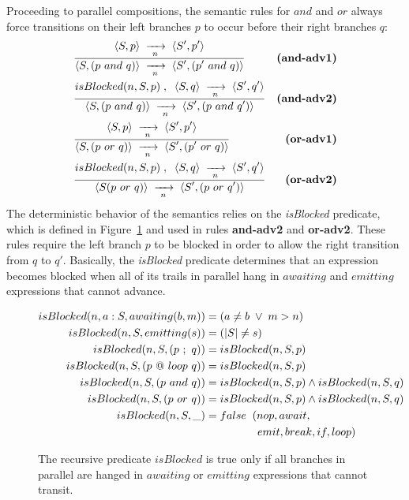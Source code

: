 Proceeding to parallel compositions, the semantic rules for $and$ and $or$ 
always force transitions on their left branches $p$ to occur before their right 
branches $q$:
%
{ \setlength{\jot}{20pt}
\begin{eqnarray*}
& \frac
    {\DS \LL S,p \RR \ST \LL S',p' \RR }
    {\DS \LL S, (p~and~q) \RR \ST \LL S', (p'~and~q) \RR }
    & \textbf{(and-adv1)}      \\
& \frac
    {\DS isBlocked(n,S,p) \1,\2 \LL S,q \RR \ST \LL S',q' \RR }
    {\DS \LL S, (p~and~q) \RR \ST \LL S', (p~and~q') \RR }
    & \textbf{(and-adv2)}      \\
& \frac
    {\DS \LL S,p \RR \ST \LL S',p' \RR }
    {\DS \LL S, (p~or~q) \RR \ST \LL S', (p'~or~q) \RR }
    & \textbf{(or-adv1)}   \\
& \frac
    {\DS isBlocked(n,S,p) \1,\2 \LL S,q \RR \ST \LL S',q' \RR }
    {\DS \LL S (p~or~q) \RR \ST \LL S', (p~or~q') \RR }
    & \textbf{(or-adv2)}   %
\end{eqnarray*}
}
%
The deterministic behavior of the semantics relies on the \emph{isBlocked} 
predicate, which is defined in Figure~\ref{fig.isBlocked} and used in rules 
\textbf{and-adv2} and \textbf{or-adv2}.
These rules require the left branch $p$ to be blocked in order to allow the 
right transition from $q$ to $q'$.
%
Basically, the \emph{isBlocked} predicate determines that an expression becomes 
blocked when all of its trails in parallel hang in $awaiting$ and $emitting$ 
expressions that cannot advance.

\begin{figure}
{\small
\begin{align*}
  isBlocked(n,a:S, awaiting(b,m)) &= (a \neq b \1\vee\1 m > n)   \\
  isBlocked(n,S, emitting(s))    &= (|S| \neq s)                     \\
  isBlocked(n,S, (p~;~q))        &= isBlocked(n,S,p)             \\
  isBlocked(n,S, (p~@~loop~q))   &= isBlocked(n,S,p)             \\
  isBlocked(n,S, (p~and~q))      &= isBlocked(n,S,p) \wedge
                                    isBlocked(n,S,q)             \\
  isBlocked(n,S, (p~or~q))       &= isBlocked(n,S,p) \wedge
                                    isBlocked(n,S,q)             \\
  isBlocked(n,S, \_)             &= false \2  (nop,await,      \\
                                  &    \5\5\5\2 emit,break,if,loop)   %
\end{align*}
}%
\caption{
The recursive predicate $isBlocked$ is true only if all branches in parallel 
are hanged in $awaiting$ or $emitting$ expressions that cannot transit.
\label{fig.isBlocked}
}
\end{figure}

